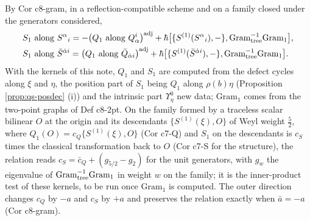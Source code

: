 \begin{remark}[The relation $S_1=-Q_1^{\rm adj}+\text{Gram terms}$]
\label{rem:qs-gram}
By Cor c8-gram, in a reflection-compatible scheme and on a family closed under the generators considered,
\[
\begin{aligned}
&S_1\ \text{along}\ S^\alpha{}_i=-\big(Q_1\ \text{along}\ Q^i_\alpha\big)^{\rm adj}+\hbar\big[\{S^{(1)}(S^\alpha{}_i),-\},\mathrm{Gram}_{\rm tree}^{-1}\mathrm{Gram}_1\big],\\
&S_1\ \text{along}\ \bar S^{\dot\alpha i}=\big(Q_1\ \text{along}\ \bar Q_{\dot\alpha i}\big)^{\rm adj}+\hbar\big[\{S^{(1)}(\bar S^{\dot\alpha i}),-\},\mathrm{Gram}_{\rm tree}^{-1}\mathrm{Gram}_1\big].
\end{aligned}
\]
With the kernels of this note, $Q_1$ and $S_1$ are computed from the defect cycles along $\xi$ and $\eta$, the position part of $S_1$ being $Q_1$ along $\rho(b)\eta$ (Proposition \ref{prop:qs-posdec} (i)) and the intrinsic part $\Upsilon^0_\eta$ new data; $\mathrm{Gram}_1$ comes from the two-point graphs of Def c8-2pt. On the family formed by a traceless scalar bilinear $O$ at the origin and its descendants $\{S^{(1)}(\xi),O\}$ of Weyl weight $\tfrac52$, where $Q_1(O)=c_Q\{S^{(1)}(\xi),O\}$ (Cor c7-Q) and $S_1$ on the descendants is $c_S$ times the classical transformation back to $O$ (Cor c7-S for the structure), the relation reads $c_S=\bar c_Q+(g_{5/2}-g_2)$ for the unit generators, with $g_w$ the eigenvalue of $\mathrm{Gram}_{\rm tree}^{-1}\mathrm{Gram}_1$ in weight $w$ on the family; it is the inner-product test of these kernels, to be run once $\mathrm{Gram}_1$ is computed. The outer direction changes $c_Q$ by $-a$ and $c_S$ by $+a$ and preserves the relation exactly when $\bar a=-a$ (Cor c8-gram).
\end{remark}

